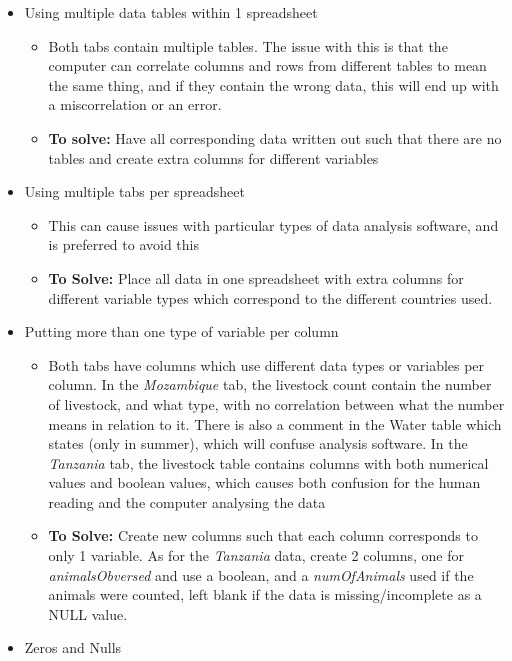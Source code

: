 \documentclass{article}
\begin{document}
\begin{itemize}
    \item Using multiple data tables within 1 spreadsheet
    \begin{itemize}
        \item Both tabs contain multiple tables. The issue with this is that the computer can correlate columns and rows from different tables to mean the same thing, and if they contain the wrong data, this will end up with a miscorrelation or an error.
        \item \textbf{To solve:} Have all corresponding data written out such that there are no tables and create extra columns for different variables
    \end{itemize}
    \item Using multiple tabs per spreadsheet
    \begin{itemize}
        \item This can cause issues with particular types of data analysis software, and is preferred to avoid this
        \item \textbf{To Solve:} Place all data in one spreadsheet with extra columns for different variable types which correspond to the different countries used.
    \end{itemize}
    \item Putting more than one type of variable per column
    \begin{itemize}
        \item Both tabs have columns which use different data types or variables per column. In the \textit{Mozambique} tab, the livestock count contain the number of livestock, and what type, with no correlation between what the number means in relation to it. There is also a comment in the Water table which states (only in summer), which will confuse analysis software. In the \textit{Tanzania} tab, the livestock table contains columns with both numerical values and boolean values, which causes both confusion for the human reading and the computer analysing the data
        \item \textbf{To Solve:} Create new columns such that each column corresponds to only 1 variable. As for the \textit{Tanzania} data, create 2 columns, one for \textit{animalsObversed} and use a boolean, and a \textit{numOfAnimals} used if the animals were counted, left blank if the data is missing/incomplete as a NULL value.
    \end{itemize}
    \item Zeros and Nulls
    \begin{itemize}

\end{itemize}
\end{itemize}
\end{document}
